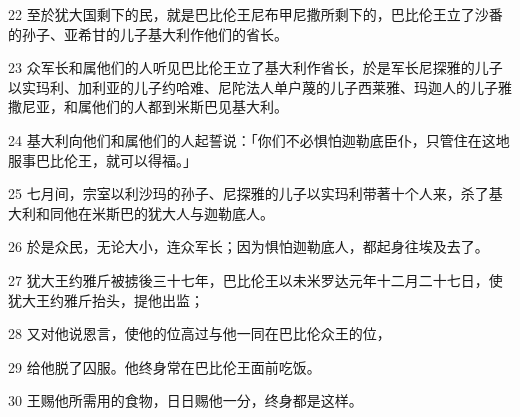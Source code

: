\par 22 至於犹大国剩下的民，就是巴比伦王尼布甲尼撒所剩下的，巴比伦王立了沙番的孙子、亚希甘的儿子基大利作他们的省长。
\par 23 众军长和属他们的人听见巴比伦王立了基大利作省长，於是军长尼探雅的儿子以实玛利、加利亚的儿子约哈难、尼陀法人单户蔑的儿子西莱雅、玛迦人的儿子雅撒尼亚，和属他们的人都到米斯巴见基大利。
\par 24 基大利向他们和属他们的人起誓说：「你们不必惧怕迦勒底臣仆，只管住在这地服事巴比伦王，就可以得福。」
\par 25 七月间，宗室以利沙玛的孙子、尼探雅的儿子以实玛利带著十个人来，杀了基大利和同他在米斯巴的犹大人与迦勒底人。
\par 26 於是众民，无论大小，连众军长；因为惧怕迦勒底人，都起身往埃及去了。
\par 27 犹大王约雅斤被掳後三十七年，巴比伦王以未米罗达元年十二月二十七日，使犹大王约雅斤抬头，提他出监；
\par 28 又对他说恩言，使他的位高过与他一同在巴比伦众王的位，
\par 29 给他脱了囚服。他终身常在巴比伦王面前吃饭。
\par 30 王赐他所需用的食物，日日赐他一分，终身都是这样。


